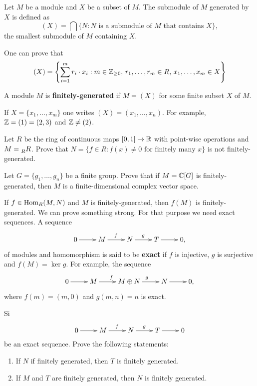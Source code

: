 \lecture{}


\begin{definition}
Let $M$ be a module and $X$ be a subset of $M$. The submodule
of $M$ generated by $X$ is defined as
\[
(X)=\bigcap\{N:N\text{ is a submodule of $M$ that contains $X$}\},
\]
the smallest submodule of $M$ containing $X$. 
\end{definition}

One can prove that  
\[
(X)=\left\{\sum_{i=1}^mr_i\cdot x_i:m\in\mathbb{Z}_{\geq0},\,r_1,\dots,r_m\in R,\,x_1,\dots,x_m\in X\right\}
\]

\begin{definition}
A module $M$ is \textbf{finitely-generated} if $M=(X)$ for some finite subset $X$ of $M$.
\end{definition}

If $X=\{x_1,\dots,x_m\}$ one writes $(X)=(x_1,\dots,x_n)$.
For example, $\mathbb{Z}=(1)=(2,3)$ and $\mathbb{Z}\ne (2)$.

\begin{exercise}
    Let $R$ be the ring of continuous maps $[0,1]\to\mathbb{R}$ with point-wise operations and 
    $M=\prescript{}{R}{R}$. Prove that
    $N=\{f\in R:f(x)\ne0\text{ for finitely many $x$}\}$ is not finitely-generated. 
\end{exercise}

\begin{exercise}
    Let $G=\{g_1,\dots,g_n\}$ be a finite group. Prove that if $M=\mathbb{C}[G]$ is finitely-generated, then
    $M$ is a finite-dimensional complex vector space. 
\end{exercise}

If $f\in\operatorname{Hom}_R(M,N)$ and $M$ is finitely-generated, then 
$f(M)$ is finitely-generated. We can prove something strong. For that purpose
we need exact sequences. 
A sequence 
	\begin{equation}
	\label{eq:exacta1}	
		\xymatrix{
        0\ar[r]
        & M
        \ar[r]^f
        & N
        \ar[r]^g
        & T\ar[r]
        & 0,
        }
  	\end{equation}
of modules and homomorphism is said to be \textbf{exact} 
if $f$ is injective, $g$ is surjective and $f(M)=\ker g$. For example,
the sequence
\[
		\xymatrix{
        0\ar[r]
        & M
        \ar[r]^f
        & M\oplus N
        \ar[r]^g
        & N\ar[r]
        & 0,
        }
\]
where $f(m)=(m,0)$ and $g(m,n)=n$ is exact.

\begin{exercise}
	Si  
	\[  
		\xymatrix{
        0\ar[r]
        & M
        \ar[r]^f
        & N
        \ar[r]^g
        & T\ar[r]
        & 0	
        }
     \]
     be an exact sequence. Prove the following statements: 
     \begin{enumerate}
     \item If $N$ if finitely generated, then $T$ is finitely generated. 
     \item If $M$ and $T$ are finitely generated, then $N$ is finitely generated. 	
     \end{enumerate}
\end{exercise}

